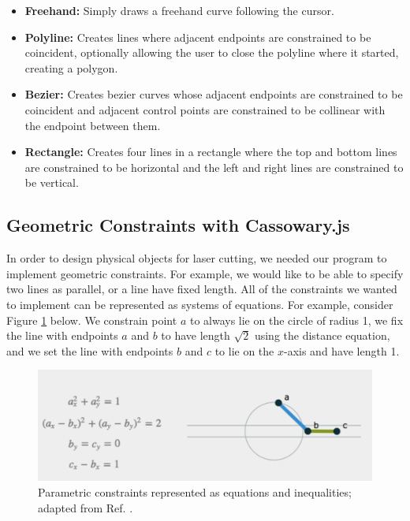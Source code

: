 \begin{itemize}
\item {\bf Freehand:} Simply draws a freehand curve following the cursor.
\item {\bf Polyline:} Creates lines where adjacent endpoints are constrained to be coincident, optionally allowing the user to close the polyline where it started, creating a polygon.
\item {\bf Bezier:} Creates bezier curves whose adjacent endpoints are constrained to be coincident and adjacent control points are constrained to be collinear with the endpoint between them.
\item {\bf Rectangle:} Creates four lines in a rectangle where the top and bottom lines are constrained to be horizontal and the left and right lines are constrained to be vertical.
\end{itemize}

\subsection*{Geometric Constraints with Cassowary.js}

In order to design physical objects for laser cutting, we needed our program to implement geometric constraints. For example, we would like to be able to specify two lines as parallel, or a line have fixed length. All of the constraints we wanted to implement can be represented as systems of equations. For example, consider Figure \ref{fig:constraints} below. We constrain point $a$ to always lie on the circle of radius 1, we fix the line with endpoints $a$ and $b$ to have length $\sqrt{2}$ using the distance equation, and we set the line with endpoints $b$ and $c$ to lie on the $x$-axis and have length 1.

\begin{figure}[H]
  \includegraphics[width=\linewidth]{constraints.jpg}
  \caption{Parametric constraints represented as equations and inequalities; adapted from Ref. \cite{keeter}. }
  \label{fig:constraints}
\end{figure}

